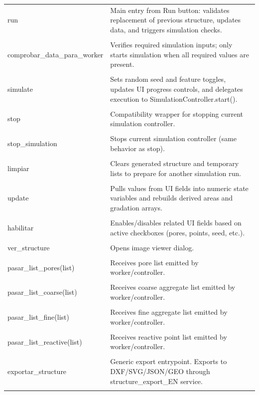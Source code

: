 ﻿\documentclass[11pt,a4paper]{article}
\begin{document}
\begin{longtable}{|p{}|p{}|}
\hline
run & Main entry from Run button: validates replacement of previous structure, updates data, and triggers simulation checks. \\\\
\hline
comprobar\_data\_para\_worker & Verifies required simulation inputs; only starts simulation when all required values are present. \\\\
\hline
simulate & Sets random seed and feature toggles, updates UI progress controls, and delegates execution to SimulationController.start(). \\\\
\hline
stop & Compatibility wrapper for stopping current simulation controller. \\\\
\hline
stop\_simulation & Stops current simulation controller (same behavior as stop). \\\\
\hline
limpiar & Clears generated structure and temporary lists to prepare for another simulation run. \\\\
\hline
update & Pulls values from UI fields into numeric state variables and rebuilds derived areas and gradation arrays. \\\\
\hline
habilitar & Enables/disables related UI fields based on active checkboxes (pores, points, seed, etc.). \\\\
\hline
ver\_structure & Opens image viewer dialog. \\\\
\hline
pasar\_list\_pores(list) & Receives pore list emitted by worker/controller. \\\\
\hline
pasar\_list\_coarse(list) & Receives coarse aggregate list emitted by worker/controller. \\\\
\hline
pasar\_list\_fine(list) & Receives fine aggregate list emitted by worker/controller. \\\\
\hline
pasar\_list\_reactive(list) & Receives reactive point list emitted by worker/controller. \\\\
\hline
exportar\_structure & Generic export entrypoint. Exports to DXF/SVG/JSON/GEO through structure\_export\_EN service. \\\\

\end{longtable}
\end{document}
